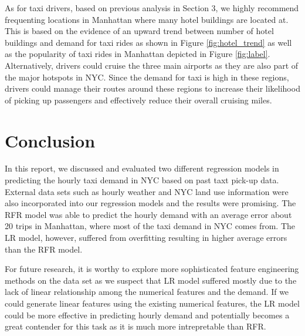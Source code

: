 \documentclass[11pt]{article}
\begin{document}
As for taxi drivers, based on previous analysis in Section 3, we highly recommend frequenting locations in Manhattan where many hotel buildings are located at. This is based on the evidence of an upward trend between number of hotel buildings and demand for taxi rides as shown in Figure \ref{fig:hotel_trend} as well as the popularity of taxi rides in Manhattan depicted in Figure \ref{fig:label}. Alternatively, drivers could cruise the three main airports as they are also part of the major hotspots in NYC. Since the demand for taxi is high in these regions, drivers could manage their routes around these regions to increase their likelihood of picking up passengers and effectively reduce their overall cruising miles.


\section{Conclusion}
In this report, we discussed and evaluated two different regression models in predicting the hourly taxi demand in NYC based on past taxt pick-up data. External data sets such as hourly weather and NYC land use information were also incorporated into our regression models and the results were promising. The RFR model was able to predict the hourly demand with an average error about 20 trips in Manhattan, where most of the taxi demand in NYC comes from. The LR model, however, suffered from overfitting resulting in higher average errors than the RFR model. 

For future research, it is worthy to explore more sophisticated feature engineering methods on the data set as we suspect that LR model suffered mostly due to the lack of linear relationship among the numerical features and the demand. If we could generate linear features using the existing numerical features, the LR model could be more effective in predicting hourly demand and potentially becomes a great contender for this task as it is much more intrepretable than RFR. 




\clearpage

\printbibliography
\end{document}

